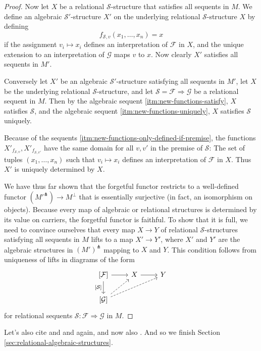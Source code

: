 \documentclass[a4paper]{article}
\theoremstyle{remark}
\theoremstyle{definition}
\begin{document}
\begin{proof}
  Now let $X$ be a relational $\mathcal{S}$-structure that satisfies all sequents in $M$.
  We define an algebraic $\mathcal{S}'$-structure $X'$ on the underlying relational $\mathcal{S}$-structure $X$ by defining
  \begin{equation}
    f_{\mathcal{S}, v}(x_1, \dots, x_n) = x
  \end{equation}
  if the assignment $v_i \mapsto x_i$ defines an interpretation of $\mathcal{F}$ in $X$, and the unique extension to an interpretation of $\mathcal{G}$ maps $v$ to $x$.
  Now clearly $X'$ satisfies all sequents in $M'$.
  
  Conversely let $X'$ be an algebraic $\mathcal{S}'$-structure satisfying all sequents in $M'$, let $X$ be the underlying relational $\mathcal{S}$-structure, and let $\mathcal{S} = \mathcal{F} \Rightarrow \mathcal{G}$ be a relational sequent in $M$.
  Then by the algebraic sequent \ref{itm:new-functions-satisfy}, $X$ satisfies $\mathcal{S}$, and the algebraic sequent \ref{itm:new-functions-uniquely}, $X$ satisfies $\mathcal{S}$ uniquely.

  Because of the sequents \ref{itm:new-functions-only-defined-if-premise}, the functions $X'_{f_{\mathcal{S}, v}}, X'_{f_{\mathcal{S}, v'}}$ have the same domain for all $v, v'$ in the premise of $\mathcal{S}$:
  The set of tuples $(x_1, \dots, x_n)$ such that $v_i \mapsto x_i$ defines an interpretation of $\mathcal{F}$ in $X$.
  Thus $X'$ is uniquely determined by $X$.

  We have thus far shown that the forgetful functor restricts to a well-defined functor $(M'^\pitchfork) \rightarrow M^\perp$ that is essentially surjective (in fact, an isomorphism on objects).
  Because every map of algebraic or relational structures is determined by its value on carriers, the forgetful functor is faithful.
  To show that it is full, we need to convince ourselves that every map $X \rightarrow Y$ of relational $\mathcal{S}$-structures satisfying all sequents in $M$ lifts to a map $X' \rightarrow Y'$, where $X'$ and $Y'$ are the algebraic structures in $(M')^\pitchfork$ mapping to $X$ and $Y$.
  This condition follows from uniqueness of lifts in diagrams of the form
  \begin{equation}
    \begin{tikzcd}
      \left[ \mathcal{F} \right] \arrow[d, "{[\mathcal{S}]}"'] \arrow[r] & X \arrow[r] & Y \\
      \left[ \mathcal{G} \right] \arrow[ur, dashed] \arrow[urr, dashed]
    \end{tikzcd}
  \end{equation}
  for relational sequents $\mathcal{S} : \mathcal{F} \Rightarrow \mathcal{G}$ in $M$.
\end{proof}

Let's also cite \cite{marked-objects} and \cite{egg} and \cite{marked-objects} again, and now also \cite{homotopy-theoretic-aspects}.
And so we finish Section \ref{sec:relational-algebraic-structures}.



\end{document}
